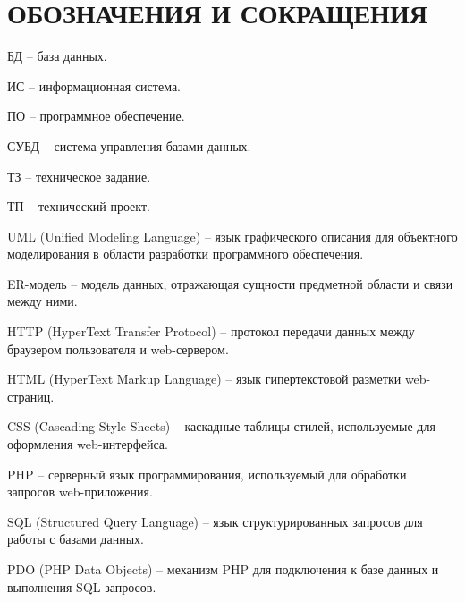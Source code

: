 \section*{ОБОЗНАЧЕНИЯ И СОКРАЩЕНИЯ}

БД -- база данных.

ИС -- информационная система.

ПО -- программное обеспечение.

СУБД -- система управления базами данных.

ТЗ -- техническое задание.

ТП -- технический проект.

UML (Unified Modeling Language) -- язык графического описания для объектного моделирования в области разработки программного обеспечения.

ER-модель -- модель данных, отражающая сущности предметной области и связи между ними.

HTTP (HyperText Transfer Protocol) -- протокол передачи данных между браузером пользователя и web-сервером.

HTML (HyperText Markup Language) -- язык гипертекстовой разметки web-страниц.

CSS (Cascading Style Sheets) -- каскадные таблицы стилей, используемые для оформления web-интерфейса.

PHP -- серверный язык программирования, используемый для обработки запросов web-приложения.

SQL (Structured Query Language) -- язык структурированных запросов для работы с базами данных.

PDO (PHP Data Objects) -- механизм PHP для подключения к базе данных и выполнения SQL-запросов.
